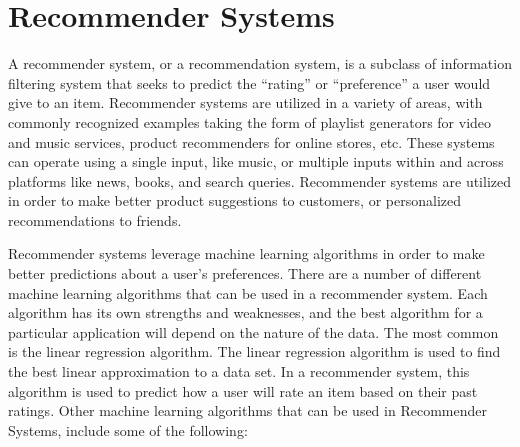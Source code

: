 \documentclass[11pt]{article}
\begin{document}
\section{Recommender Systems}

A recommender system, or a recommendation system, is a subclass of information filtering system that seeks to predict the “rating” or “preference” a user would give to an item. Recommender systems are utilized in a variety of areas, with commonly recognized examples taking the form of playlist generators for video and music services, product recommenders for online stores, etc. These systems can operate using a single input, like music, or multiple inputs within and across platforms like news, books, and search queries. Recommender systems are utilized in order to make better product suggestions to customers, or personalized recommendations to friends.

Recommender systems leverage machine learning algorithms in order to make better predictions about a user’s preferences. There are a number of different machine learning algorithms that can be used in a recommender system.  Each algorithm has its own strengths and weaknesses, and the best algorithm for a particular application will depend on the nature of the data. The most common is the linear regression algorithm. The linear regression algorithm is used to find the best linear approximation to a data set. In a recommender system, this algorithm is used to predict how a user will rate an item based on their past ratings. Other machine learning algorithms that can be used in Recommender Systems, include some of the following:
\end{document}
